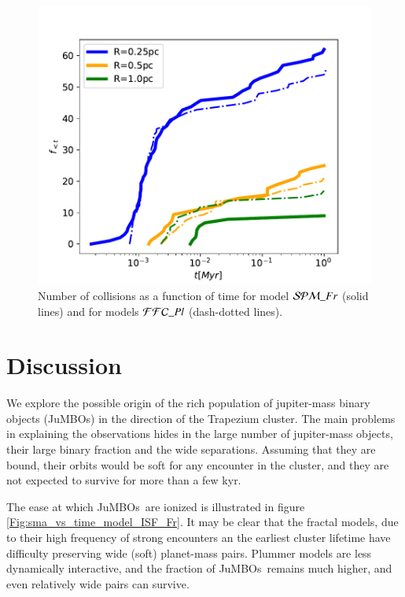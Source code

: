 \documentclass[submission,phys]{lib/SciPost}
\newcommand{\jumbos}{\mbox{JuMBOs}}
\begin{document}
\begin{figure}
  \centering
    \includegraphics[width=\columnwidth]{figures/fig_collision_evolution_ISF_Fr.pdf
    }
        \caption{Number of collisions as a function of time for model
          ${\cal SPM}\_Fr$ (solid lines) and for models ${\cal
            FFC}\_Pl$ (dash-dotted lines).}
         \label{Fig:collision_evolution_ISF_Fr}
\end{figure}

\section{Discussion}

We explore the possible origin of the rich population of jupiter-mass
binary objects (\jumbos) in the direction of the Trapezium cluster.
The main problems in explaining the observations hides in the large
number of jupiter-mass objects, their large binary fraction and the
wide separations. Assuming that they are bound, their orbits
would be soft for any encounter in the cluster, and they are not
expected to survive for more than a few kyr.

The ease at which \jumbos\, are ionized is illustrated in
figure\,\ref{Fig:sma_vs_time_model_ISF_Fr}. It may be clear that the
fractal models, due to their high frequency of strong encounters an
the earliest cluster lifetime have difficulty preserving wide (soft)
planet-mass pairs. Plummer models are less dynamically interactive,
and the fraction of \jumbos\, remains much higher, and even relatively
wide pairs can survive.
\end{document}
